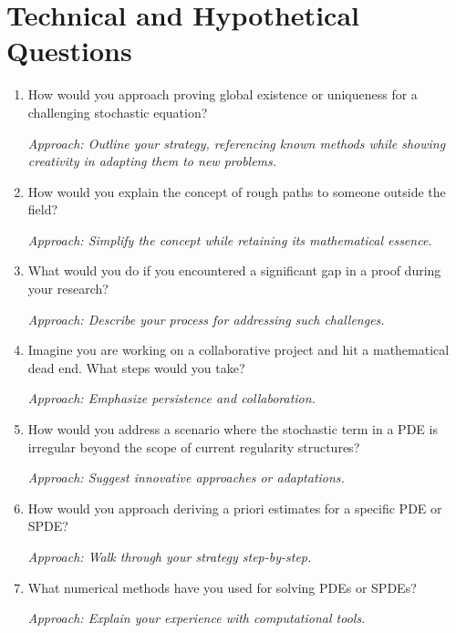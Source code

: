 \documentclass[12pt]{article}
\numberwithin{equation}{section}
\begin{document}
\section{Technical and Hypothetical Questions}
\begin{enumerate}
    \item How would you approach proving global existence or uniqueness for a challenging stochastic equation?
    
    \textit{Approach: Outline your strategy, referencing known methods while showing creativity in adapting them to new problems.}

    \item How would you explain the concept of rough paths to someone outside the field?
    
    \textit{Approach: Simplify the concept while retaining its mathematical essence.}

    \item What would you do if you encountered a significant gap in a proof during your research?
    
    \textit{Approach: Describe your process for addressing such challenges.}

    \item Imagine you are working on a collaborative project and hit a mathematical dead end. What steps would you take?
    
    \textit{Approach: Emphasize persistence and collaboration.}

    \item How would you address a scenario where the stochastic term in a PDE is irregular beyond the scope of current regularity structures?
    
    \textit{Approach: Suggest innovative approaches or adaptations.}

    \item How would you approach deriving a priori estimates for a specific PDE or SPDE?
    
    \textit{Approach: Walk through your strategy step-by-step.}

    \item What numerical methods have you used for solving PDEs or SPDEs?
    
    \textit{Approach: Explain your experience with computational tools.}
\end{enumerate}
\end{document}
